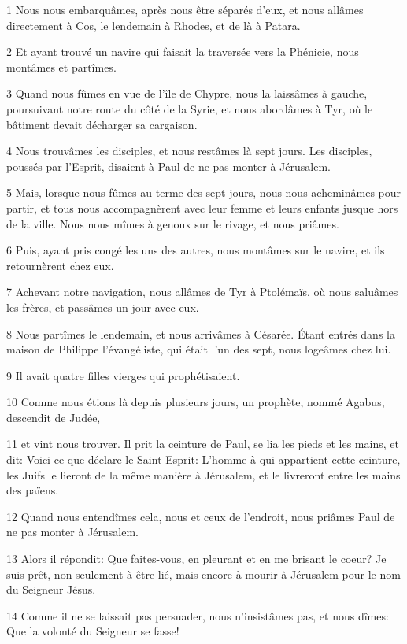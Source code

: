 \par 1 Nous nous embarquâmes, après nous être séparés d'eux, et nous allâmes directement à Cos, le lendemain à Rhodes, et de là à Patara.
\par 2 Et ayant trouvé un navire qui faisait la traversée vers la Phénicie, nous montâmes et partîmes.
\par 3 Quand nous fûmes en vue de l'île de Chypre, nous la laissâmes à gauche, poursuivant notre route du côté de la Syrie, et nous abordâmes à Tyr, où le bâtiment devait décharger sa cargaison.
\par 4 Nous trouvâmes les disciples, et nous restâmes là sept jours. Les disciples, poussés par l'Esprit, disaient à Paul de ne pas monter à Jérusalem.
\par 5 Mais, lorsque nous fûmes au terme des sept jours, nous nous acheminâmes pour partir, et tous nous accompagnèrent avec leur femme et leurs enfants jusque hors de la ville. Nous nous mîmes à genoux sur le rivage, et nous priâmes.
\par 6 Puis, ayant pris congé les uns des autres, nous montâmes sur le navire, et ils retournèrent chez eux.
\par 7 Achevant notre navigation, nous allâmes de Tyr à Ptolémaïs, où nous saluâmes les frères, et passâmes un jour avec eux.
\par 8 Nous partîmes le lendemain, et nous arrivâmes à Césarée. Étant entrés dans la maison de Philippe l'évangéliste, qui était l'un des sept, nous logeâmes chez lui.
\par 9 Il avait quatre filles vierges qui prophétisaient.
\par 10 Comme nous étions là depuis plusieurs jours, un prophète, nommé Agabus, descendit de Judée,
\par 11 et vint nous trouver. Il prit la ceinture de Paul, se lia les pieds et les mains, et dit: Voici ce que déclare le Saint Esprit: L'homme à qui appartient cette ceinture, les Juifs le lieront de la même manière à Jérusalem, et le livreront entre les mains des païens.
\par 12 Quand nous entendîmes cela, nous et ceux de l'endroit, nous priâmes Paul de ne pas monter à Jérusalem.
\par 13 Alors il répondit: Que faites-vous, en pleurant et en me brisant le coeur? Je suis prêt, non seulement à être lié, mais encore à mourir à Jérusalem pour le nom du Seigneur Jésus.
\par 14 Comme il ne se laissait pas persuader, nous n'insistâmes pas, et nous dîmes: Que la volonté du Seigneur se fasse!
